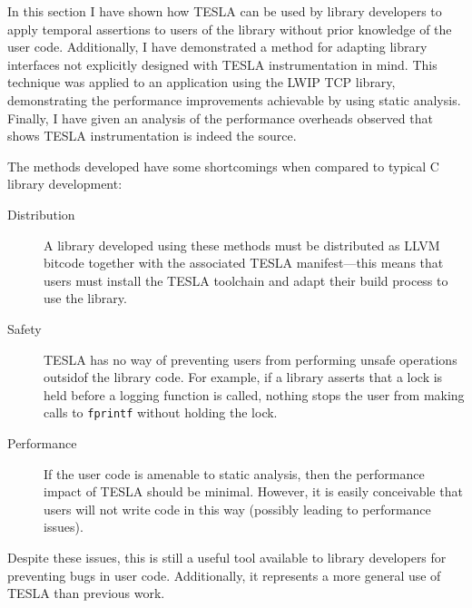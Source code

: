 In this section I have shown how TESLA can be used by library developers to
apply temporal assertions to users of the library without prior knowledge of the
user code. Additionally, I have demonstrated a method for adapting library
interfaces not explicitly designed with TESLA instrumentation in mind. This
technique was applied to an application using the LWIP TCP library,
demonstrating the performance improvements achievable by using static
analysis. Finally, I have given an analysis of the performance overheads
observed that shows TESLA instrumentation is indeed the source.

The methods developed have some shortcomings when compared to typical C library
development:
\begin{description}
  \item[Distribution] A library developed using these methods must be
    distributed as LLVM bitcode together with the associated TESLA
    manifest---this means that users must install the TESLA toolchain and adapt
    their build process to use the library.

  \item[Safety] TESLA has no way of preventing users from performing unsafe
    operations outsidof the library code. For example, if a library asserts that
    a lock is held before a logging function is called, nothing stops the user
    from making calls to \texttt{fprintf} without holding the lock.

  \item[Performance] If the user code is amenable to static analysis, then the
    performance impact of TESLA should be minimal. However, it is easily
    conceivable that users will not write code in this way (possibly leading to
    performance issues).
\end{description}

Despite these issues, this is still a useful tool available to library
developers for preventing bugs in user code. Additionally, it represents a more
general use of TESLA than previous work.
